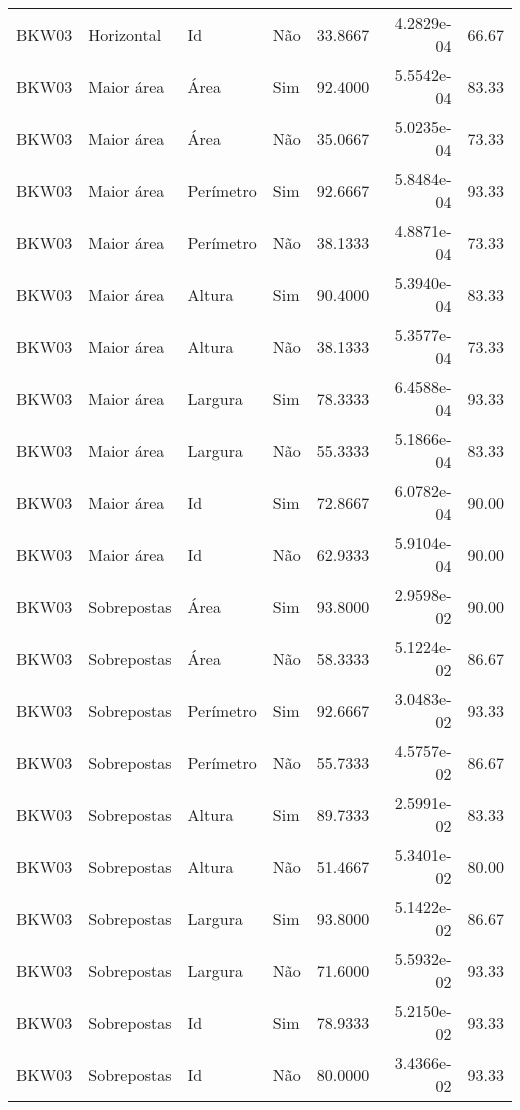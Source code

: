 \begin{tabular}{llllrrr}
BKW03     & Horizontal  & Id        & Não         & 33.8667      & 4.2829e-04 & 66.67    \\
BKW03     & Maior área  & Área      & Sim         & 92.4000      & 5.5542e-04 & 83.33    \\
BKW03     & Maior área  & Área      & Não         & 35.0667      & 5.0235e-04 & 73.33    \\
BKW03     & Maior área  & Perímetro & Sim         & 92.6667      & 5.8484e-04 & 93.33    \\
BKW03     & Maior área  & Perímetro & Não         & 38.1333      & 4.8871e-04 & 73.33    \\
BKW03     & Maior área  & Altura    & Sim         & 90.4000      & 5.3940e-04 & 83.33    \\
BKW03     & Maior área  & Altura    & Não         & 38.1333      & 5.3577e-04 & 73.33    \\
BKW03     & Maior área  & Largura   & Sim         & 78.3333      & 6.4588e-04 & 93.33    \\
BKW03     & Maior área  & Largura   & Não         & 55.3333      & 5.1866e-04 & 83.33    \\
BKW03     & Maior área  & Id        & Sim         & 72.8667      & 6.0782e-04 & 90.00    \\
BKW03     & Maior área  & Id        & Não         & 62.9333      & 5.9104e-04 & 90.00    \\
BKW03     & Sobrepostas & Área      & Sim         & 93.8000      & 2.9598e-02 & 90.00    \\
BKW03     & Sobrepostas & Área      & Não         & 58.3333      & 5.1224e-02 & 86.67    \\
BKW03     & Sobrepostas & Perímetro & Sim         & 92.6667      & 3.0483e-02 & 93.33    \\
BKW03     & Sobrepostas & Perímetro & Não         & 55.7333      & 4.5757e-02 & 86.67    \\
BKW03     & Sobrepostas & Altura    & Sim         & 89.7333      & 2.5991e-02 & 83.33    \\
BKW03     & Sobrepostas & Altura    & Não         & 51.4667      & 5.3401e-02 & 80.00    \\
BKW03     & Sobrepostas & Largura   & Sim         & 93.8000      & 5.1422e-02 & 86.67    \\
BKW03     & Sobrepostas & Largura   & Não         & 71.6000      & 5.5932e-02 & 93.33    \\
BKW03     & Sobrepostas & Id        & Sim         & 78.9333      & 5.2150e-02 & 93.33    \\
BKW03     & Sobrepostas & Id        & Não         & 80.0000      & 3.4366e-02 & 93.33    \\
\hline
\end{tabular}